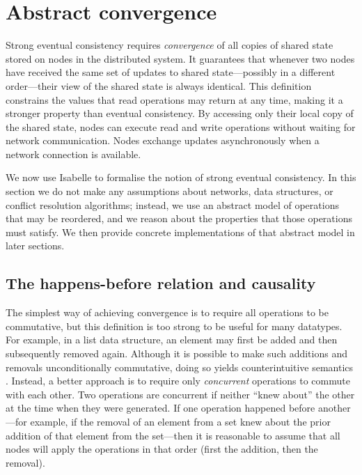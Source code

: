 \section{Abstract convergence}
\label{sect.abstract.convergence}

Strong eventual consistency requires \emph{convergence} of all copies of shared state stored on nodes in the distributed system.
It guarantees that whenever two nodes have received the same set of updates to shared state---possibly in a different order---their view of the shared state is always identical.
This definition constrains the values that read operations may return at any time, making it a stronger property than eventual consistency.
By accessing only their local copy of the shared state, nodes can execute read and write operations without waiting for network communication.
Nodes exchange updates asynchronously when a network connection is available.  

We now use Isabelle to formalise the notion of strong eventual consistency.
In this section we do not make any assumptions about networks, data structures, or conflict resolution algorithms; instead, we use an abstract model of operations that may be reordered, and we reason about the properties that those operations must satisfy.
We then provide concrete implementations of that abstract model in later sections.

\subsection{The happens-before relation and causality}\label{sect.happens.before}

The simplest way of achieving convergence is to require all operations to be commutative, but this definition is too strong to be useful for many datatypes.
For example, in a list data structure, an element may first be added and then subsequently removed again.
Although it is possible to make such additions and removals unconditionally commutative, doing so yields counterintuitive semantics \cite{Bieniusa:2012wu,Bieniusa:2012gt}.
Instead, a better approach is to require only \emph{concurrent} operations to commute with each other.
Two operations are concurrent if neither ``knew about'' the other at the time when they were generated.
If one operation happened before another---for example, if the removal of an element from a set knew about the prior addition of that element from the set---then it is reasonable to assume that all nodes will apply the operations in that order (first the addition, then the removal).

